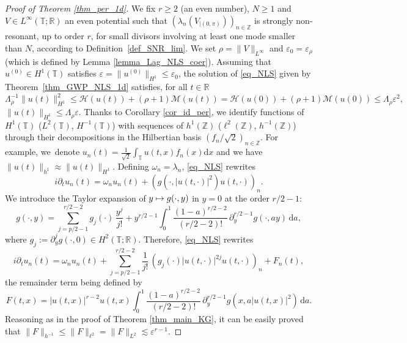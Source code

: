 \documentclass[JEP,XML,SOM,Unicode,NoEqCountersInSection,published]{cedram}
\let\epsilon\varepsilon
\newcommand\mto{\mathchoice{\longmapsto}{\mapsto}{\mapsto}{\mapsto}}
\theoremstyle{definition}
\begin{document}
\begin{proof}[Proof of Theorem \ref{thm_per_1d}] We fix $r\geq 2$ (an even number), $N\geq 1$ and $V\in L^\infty(\mathbb{T};\mathbb{R})$ an even potential such that $(\lambda_n(V_{|(0,\pi)}))_{n\in \mathbb{Z}}$ is strongly non-resonant, up to order $r$, for small divisors involving at least one mode smaller than $N$, according to Definition~\ref{def_SNR_lim}. We set $\rho = \|V\|_{L^\infty}$ and $\epsilon_0 = \varepsilon_{\rho}$ (which is defined by Lemma \ref{lemma_Lag_NLS_coer}). Assuming that $u^{(0)}\in H^1(\mathbb{T})$ satisfies $\varepsilon = \| u^{(0)} \|_{H^1} \leq \epsilon_0$, the solution of \eqref{eq_NLS} given by Theorem~\ref{thm_GWP_NLS_1d} satisfies, for all $t\in \mathbb{R}$
\begin{equation}
\label{eq_glob_cont_norm}
\Lambda_\rho^{-1} \| u(t) \|_{H^1}^2 \leq \mathcal{H}(u(t))+ (\rho+1) \mathcal{M}(u(t)) = \mathcal{H}(u(0))+ (\rho+1) \mathcal{M}(u(0)) \leq \Lambda_\rho \varepsilon^2,
\end{equation}
\ie $\| u(t) \|_{H^1}\leq \Lambda_{\rho} \varepsilon$. Thanks to Corollary \ref{cor_id_per}, we identify functions of $H^1(\mathbb{T})$ (\resp $L^2(\mathbb{T})$, \resp $H^{-1}(\mathbb{T})$) with sequences of $h^1(\mathbb{Z})$ (\resp $\ell^2(\mathbb{Z})$, \resp $h^{-1}(\mathbb{Z})$) through their decompositions in the Hilbertian basis $(f_n/\sqrt{2})_{n\in \mathbb{Z}}$. For example, we~denote $u_n(t) = \frac1{\sqrt2} \int_\mathbb{T} u(t,x) f_n(x) \mathrm{d}x$ and we have $\| u(t) \|_{h^1} \approx \| u(t) \|_{H^1}$. Defining $\omega_n = \lambda_n$, \eqref{eq_NLS} rewrites
\[
i\partial_t u_n(t) = \omega_n u_n(t) + (g(\cdot,|u(t,\cdot)|^2) u(t,\cdot))_{n}.
\]
We introduce the Taylor expansion of $y\mto g(\cdot,y)$ in $y=0$ at the order $r/2-1$:
\[
g(\cdot,y) = \sum_{j=p/2-1}^{r/2-2} g_j(\cdot)\, \frac{y^j}{j !} + y^{r/2-1}\int_0^1 \frac{(1-a)^{r/2-2}}{(r/2-2) ! }\, \partial_y^{r/2-1} g(\cdot, a y) \, \mathrm{d}a,
\]
where $g_j:= \partial_y^j g(\cdot,0) \in H^2(\mathbb{T};\mathbb{R})$. Therefore, \eqref{eq_NLS} rewrites
\[
i\partial_t u_n(t) = \omega_n u_n(t) + \sum_{j=p/2-1}^{r/2-2} \frac1{j!}\, (g_j(\cdot) |u(t,\cdot)|^{2j}u(t,\cdot))_n + F_n(t),
\]
the remainder term being defined by
\[
F(t,x)=|u(t,x)|^{r-2}u(t,x) \int_0^1 \frac{(1-a)^{r/2-2}}{(r/2-2) ! }\, \partial_y^{r/2-1} g(x, a |u(t,x)|^{2}) \, \mathrm{d}a.
\]
Reasoning as in the proof of Theorem \ref{thm_main_KG}, it can be easily proved that $\| F\|_{h^{-1}} \leq \| F\|_{\ell^2} = \| F\|_{L^2} \lesssim \varepsilon^{r-1}$.


\end{proof}
\end{document}
